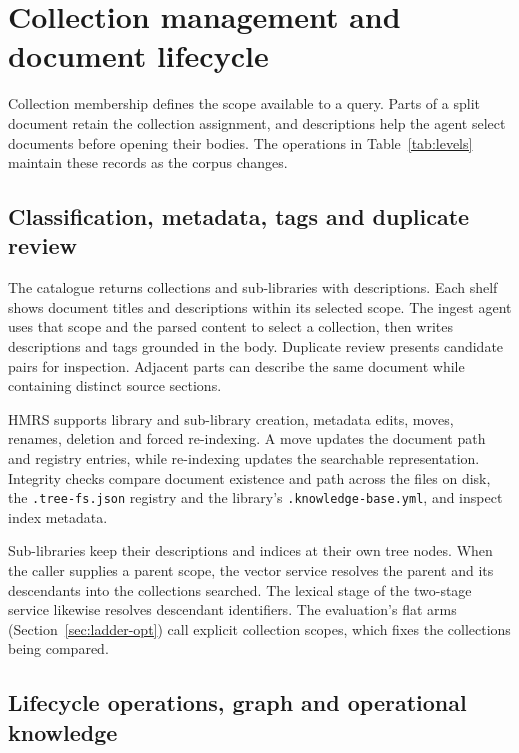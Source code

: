 \section{Collection management and document lifecycle}
\label{sec:organization}

Collection membership defines the scope available to a query. Parts of
a split document retain the collection assignment, and descriptions
help the agent select documents before opening their bodies. The
operations in Table~\ref{tab:levels} maintain these records as the corpus
changes.

\subsection{Classification, metadata, tags and duplicate review}
\label{sec:org-placement}
\label{sec:org-registries}
\label{sec:org-tags}
\label{sec:org-dedup}

The catalogue returns collections and sub-libraries with descriptions.
Each shelf shows document titles and descriptions within its selected scope.
The ingest agent uses that scope and the parsed content to select a
collection,
then writes descriptions and tags grounded in the body. Duplicate review
presents candidate pairs for inspection. Adjacent parts can describe
the same document while containing distinct source sections.

HMRS supports library and sub-library creation, metadata edits, moves,
renames, deletion and forced re-indexing. A move updates the document path
and registry entries, while re-indexing updates the searchable representation.
 Integrity checks compare document existence and path across the files on
disk, the \texttt{.tree-fs.json} registry and the library's
\texttt{.knowledge-base.yml}, and inspect index metadata.

Sub-libraries keep their descriptions and indices at their own tree nodes.
When the caller supplies a parent scope, the vector service resolves the
parent and its descendants into the collections searched. The lexical stage
of the two-stage service likewise resolves descendant identifiers. The
evaluation's flat arms (Section~\ref{sec:ladder-opt}) call explicit
collection scopes, which fixes the collections being compared.

\subsection{Lifecycle operations, graph and operational knowledge}
\label{sec:org-lifecycle}
\label{sec:org-graph}
\label{sec:org-experience}

